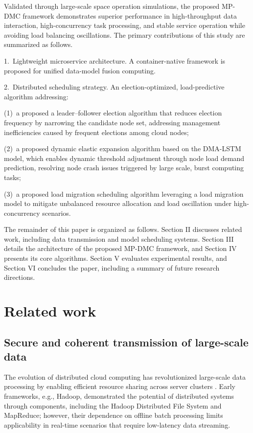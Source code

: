 \documentclass[twoside,twocolumn]{article}
\begin{document}
Validated through large-scale space operation simulations, the proposed MP-DMC framework demonstrates superior performance in high-throughput data interaction, high-concurrency task processing, and stable service operation while avoiding load balancing oscillations. The primary contributions of this study are summarized as follows.

1.~Lightweight microservice architecture. A container-native framework is proposed for unified data-model fusion computing.

2.~Distributed scheduling strategy. An election-optimized, load-predictive algorithm addressing:

\hspace{2em}(1)~a proposed a leader--follower election algorithm that reduces election frequency by narrowing the candidate node set, addressing management inefficiencies caused by frequent elections among cloud nodes;

\hspace{2em}(2)~a proposed dynamic elastic expansion algorithm based on the DMA-LSTM model, which enables dynamic threshold adjustment through node load demand prediction, resolving node crash issues triggered by large scale, burst computing tasks;

\hspace{2em}(3)~a proposed load migration scheduling algorithm leveraging a load migration model to mitigate unbalanced resource allocation and load oscillation under high-concurrency scenarios.

The remainder of this paper is organized as follows. Section II discusses related work, including data transmission and model scheduling systems. Section III details the architecture of the proposed MP-DMC framework, and Section IV presents its core algorithms. Section V evaluates experimental results, and Section VI concludes the paper, including a summary of future research directions.

\section{Related work}

\subsection{Secure and coherent transmission of large-scale data}

The evolution of distributed cloud computing has revolutionized large-scale data processing by enabling efficient resource sharing across server clusters \citep{Wang2023}. Early frameworks, e.g., Hadoop, demonstrated the potential of distributed systems through components, including the Hadoop Distributed File System and MapReduce; however, their dependence on offline batch processing limits applicability in real-time scenarios that require low-latency data streaming.
\end{document}
